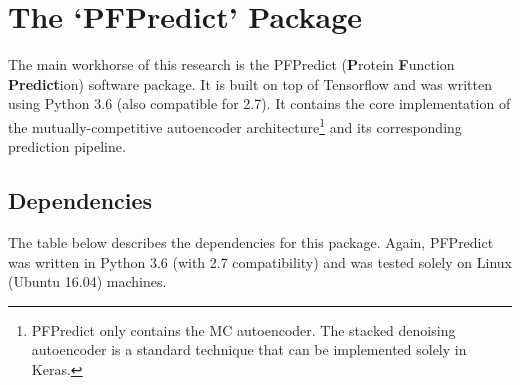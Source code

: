 %
%
%
%
%

\chapter{The `PFPredict' Package}
\label{AppendixPFPredict}

\par The main workhorse of this research is the PFPredict (\textbf{P}rotein
\textbf{F}unction \textbf{Predict}ion) software package. It is built on top of
Tensorflow and was written using Python 3.6 (also compatible for 2.7). It
contains the core implementation of the mutually-competitive autoencoder
architecture\footnote{
    PFPredict only contains the MC autoencoder. The stacked denoising
    autoencoder is a standard technique that can be implemented solely in
    Keras.
} and its corresponding prediction pipeline.

\section{Dependencies}

\par The table below describes the dependencies for this package. Again,
PFPredict was written in Python 3.6 (with 2.7 compatibility) and was tested
solely on Linux (Ubuntu 16.04) machines.

